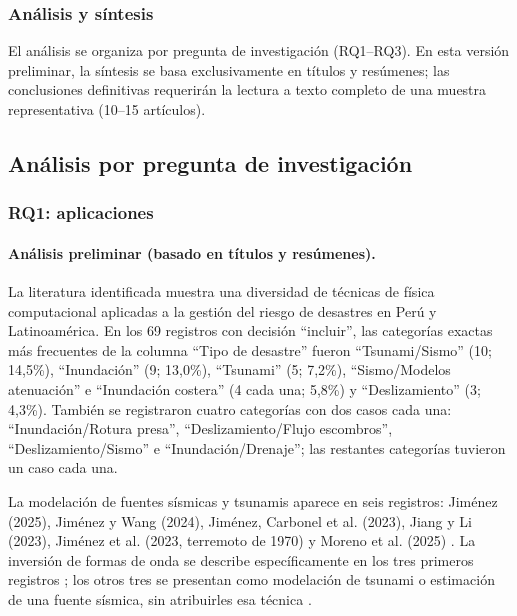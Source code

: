 \documentclass[12pt,a4paper]{article}
\begin{document}
\subsubsection{Análisis y síntesis}
El análisis se organiza por pregunta de investigación (RQ1--RQ3). En esta versión preliminar, la síntesis se basa exclusivamente en títulos y resúmenes; las conclusiones definitivas requerirán la lectura a texto completo de una muestra representativa (10--15 artículos).

\subsection{Análisis por pregunta de investigación}
\subsubsection{RQ1: aplicaciones}
\label{sec:rq1}
\paragraph*{Análisis preliminar (basado en títulos y resúmenes).}
La literatura identificada muestra una diversidad de técnicas de física computacional aplicadas a la gestión del riesgo de desastres en Perú y Latinoamérica. En los 69 registros con decisión ``incluir'', las categorías exactas más frecuentes de la columna ``Tipo de desastre'' fueron ``Tsunami/Sismo'' (10; 14,5\%), ``Inundación'' (9; 13,0\%), ``Tsunami'' (5; 7,2\%), ``Sismo/Modelos atenuación'' e ``Inundación costera'' (4 cada una; 5,8\%) y ``Deslizamiento'' (3; 4,3\%). También se registraron cuatro categorías con dos casos cada una: ``Inundación/Rotura presa'', ``Deslizamiento/Flujo escombros'', ``Deslizamiento/Sismo'' e ``Inundación/Drenaje''; las restantes categorías tuvieron un caso cada una. 

La modelación de fuentes sísmicas y tsunamis aparece en seis registros: Jiménez (2025), Jiménez y Wang (2024), Jiménez, Carbonel et al. (2023), Jiang y Li (2023), Jiménez et al. (2023, terremoto de 1970) y Moreno et al. (2025) \parencite{jimenez2025numerical, jimenez2024numerical, jimnez2023seismic, jiang2023estimation, jimnez2023numerical, moreno2025tsunami}. La inversión de formas de onda se describe específicamente en los tres primeros registros \parencite{jimenez2025numerical, jimenez2024numerical, jimnez2023seismic}; los otros tres se presentan como modelación de tsunami o estimación de una fuente sísmica, sin atribuirles esa técnica \parencite{jiang2023estimation, jimnez2023numerical, moreno2025tsunami}.
\end{document}
